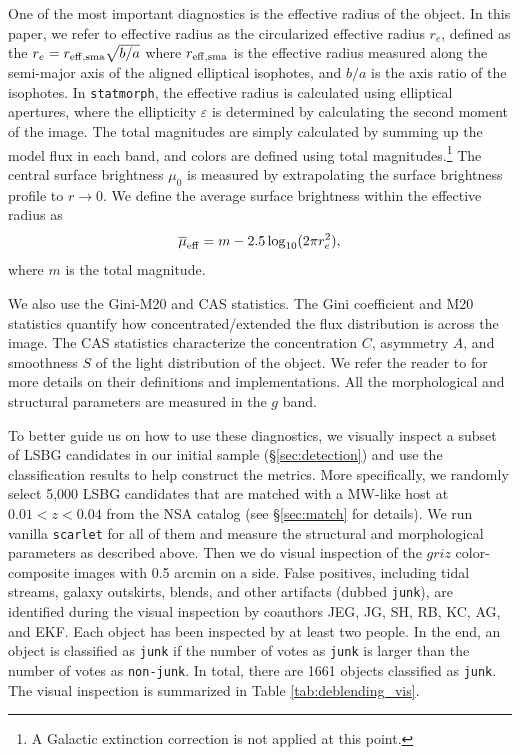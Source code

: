 \documentclass[twocolumn,astrosymb,twocolappendix]{aastex631}
\newcommand{\code}[1]{\texttt{#1}}
\begin{document}
\begin{CJK*}{UTF8}{gbsn}
One of the most important diagnostics is the effective radius of the object. In this paper, we refer to effective radius as the circularized effective radius $r_{e}$, defined as the $r_{e} = r_{\rm eff, sma} \sqrt{b/a}$ where $r_{\rm eff, sma}$ is the effective radius measured along the semi-major axis of the aligned elliptical isophotes, and $b/a$ is the axis ratio of the isophotes. In \code{statmorph}, the effective radius is calculated using elliptical apertures, where the ellipticity $\varepsilon$ is determined by calculating the second moment of the image. The total magnitudes are simply calculated by summing up the model flux in each band, and colors are defined using total magnitudes.\footnote{A Galactic extinction correction is not applied at this point.} The central surface brightness $\mu_0$ is measured by extrapolating the surface brightness profile to $r\to 0$. We define the average surface brightness within the effective radius as 
\begin{equation}\label{eq:mu_eff}
    \overline{\mu}_{\rm eff} = m - 2.5 \log_{10}(2 \pi r_e^2),
\end{equation}
where $m$ is the total magnitude. 

We also use the Gini-M20 and CAS statistics. The Gini coefficient and M20 statistics \citep{Abraham2003,Lotz2004} quantify how concentrated/extended the flux distribution is across the image. The CAS statistics characterize the concentration $C$, asymmetry $A$, and smoothness $S$ of the light distribution of the object. We refer the reader to \citet{statmorph} for more details on their definitions and implementations. All the morphological and structural parameters are measured in the $g$ band.


To better guide us on how to use these diagnostics, we visually inspect a subset of LSBG candidates in our initial sample (\S \ref{sec:detection}) and use the classification results to help construct the metrics. More specifically, we randomly select 5,000 LSBG candidates that are matched with a MW-like host at $0.01 < z < 0.04$ from the NSA catalog (see \S\ref{sec:match} for details). We run vanilla \code{scarlet} for all of them and measure the structural and morphological parameters as described above. Then we do visual inspection of the $griz$ color-composite images with 0.5 arcmin on a side. False positives, including tidal streams, galaxy outskirts, blends, and other artifacts (dubbed \code{junk}), are identified during the visual inspection by coauthors JEG, JG, SH, RB, KC, AG, and EKF. Each object has been inspected by at least two people. In the end, an object is classified as \code{junk} if the number of votes as \code{junk} is larger than the number of votes as \code{non-junk}. In total, there are 1661 objects classified as \code{junk}. The visual inspection is summarized in Table \ref{tab:deblending_vis}.



\end{CJK*}
\end{document}
